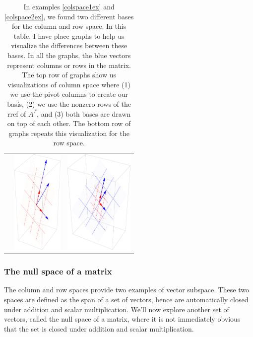 \begin{table}
\begin{tabular}{ccc}
&\includegraphics[height=2in]{02-Applications/support/rowspace2}
&\includegraphics[height=2in]{02-Applications/support/rowspace3}
\end{tabular}

\caption{\label{column and row space table} In examples \ref{colspace1ex} and \ref{colspace2ex}, we found two different bases for the column and row space. In this table, I have place graphs to help us visualize the differences between these bases.  In all the graphs, the blue vectors represent columns or rows in the matrix.  The top row of graphs show us visualizations of column space where (1) we use the pivot columns to create our basis, (2) we use the nonzero rows of the rref of $A^T$, and (3) both bases are drawn on top of each other.
The bottom row of graphs repeats this visualization for the row space.}
\end{table}


\subsubsection{The null space of a matrix}
The column and row spaces provide two examples of vector subspace. These two spaces are defined as the span of a set of vectors, hence are automatically closed under addition and scalar multiplication. We'll now explore another set of vectors, called the null space of a matrix, where it is not immediately obvious that the set is closed under addition and scalar multiplication.

